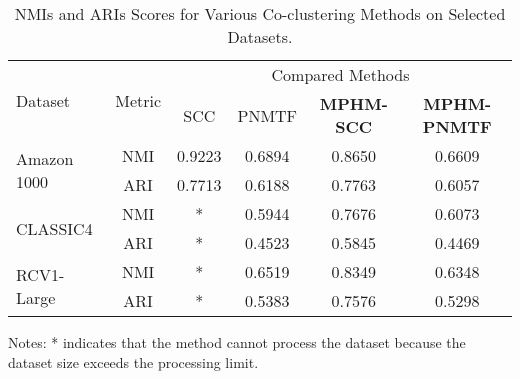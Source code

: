 \begin{table*}[htbp]
    \centering
    \caption{NMIs and ARIs Scores for Various Co-clustering Methods on Selected Datasets.}
    \label{tab:evaluation-metrics}
    \begin{tabular}{@{} l c cccc @{}}
        \toprule
        \multirow{2}{*}{Dataset}     & \multirow{2}{*}{Metric} & \multicolumn{4}{c}{Compared Methods}                                                                                                        \\
        \cmidrule{3-6}
                                     &                         & SCC \cite{dhillon2001CoclusteringDocumentsWords} & PNMTF \cite{chen2023ParallelNonNegativeMatrix} & \textbf{MPHM-SCC} & \textbf{MPHM-PNMTF} \\
        \midrule
        \multirow{2}{*}{Amazon 1000} & NMI                     & 0.9223                                           & 0.6894                                         & 0.8650            & 0.6609              \\
                                     & ARI                     & 0.7713                                           & 0.6188                                         & 0.7763            & 0.6057              \\
        \multirow{2}{*}{CLASSIC4}    & NMI                     & *                                                & 0.5944                                         & 0.7676            & 0.6073              \\
                                     & ARI                     & *                                                & 0.4523                                         & 0.5845            & 0.4469              \\
        \multirow{2}{*}{RCV1-Large}  & NMI                     & *                                                & 0.6519                                         & 0.8349            & 0.6348              \\
                                     & ARI                     & *                                                & 0.5383                                         & 0.7576            & 0.5298              \\
        \bottomrule
    \end{tabular}
    \begin{tablenotes}
        \small
        \item Notes: * indicates that the method cannot process the dataset because the dataset size exceeds the processing limit.
    \end{tablenotes}
\end{table*}

